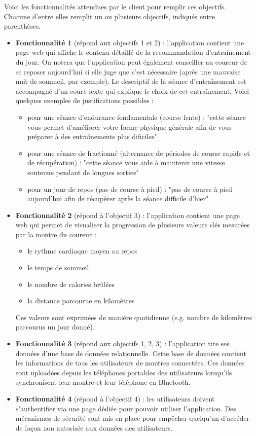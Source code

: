 \documentclass[french]{article}
\begin{document}
    Voici les fonctionnalités attendues par le client pour remplir ces objectifs. Chacune d'entre elles remplit un ou plusieurs objectifs, indiqués entre parenthèses.
    \begin{itemize}
        \item \textbf{Fonctionnalité 1} (répond aux objectifs 1 et 2) : l'application contient une page web qui affiche le contenu détaillé de la recommandation d'entraînement du jour. On notera que l'application peut également conseiller au coureur de se reposer aujourd'hui si elle juge que c'est nécessaire (après une mauvaise nuit de sommeil, par exemple). Le descriptif de la séance d'entraînement est accompagné d'un court texte qui explique le choix de cet entraînement. Voici quelques exemples de justifications possibles :
        \begin{itemize}
            \item pour une séance d'endurance fondamentale (course lente) : "cette séance vous permet d'améliorer votre forme physique générale afin de vous préparer à des entraînements plus dificiles"
            \item pour une séance de fractionné (alternance de périodes de course rapide et de récupération) : "cette séance vous aide à maintenir une vitesse soutenue pendant de longues sorties"
            \item pour un jour de repos (pas de course à pied) : "pas de course à pied aujourd'hui afin de récupérer après la séance difficile d'hier"
        \end{itemize}
        \item \textbf{Fonctionnalité 2} (répond à l'objectif 3) : l'application contient une page web qui permet de visualiser la progression de plusieurs valeurs clés mesurées par la montre du coureur :
        \begin{itemize}
            \item le rythme cardiaque moyen au repos
            \item le temps de sommeil
            \item le nombre de calories brûlées
            \item la distance parcourue en kilomètres
        \end{itemize}
        Ces valeurs sont exprimées de manière quotidienne (e.g. nombre de kilomètres parcourus un jour donné).
        \item \textbf{Fonctionnalité 3} (répond aux objectifs 1, 2, 3) : l'application tire ses données d'une base de données relationnelle. Cette base de données contient les informations de tous les utilisateurs de montres connectées. Ces données sont uploadées depuis les téléphones portables des utilisateurs lorsqu'ils synchronisent leur montre et leur téléphone en Bluetooth.
        \item \textbf{Fonctionnalité 4} (répond à l'objectif 4) : les utilisateurs doivent s'authentifier via une page dédiée pour pouvoir utiliser l'application. Des mécanismes de sécurité sont mis en place pour empêcher quelqu'un d'accéder de façon non autorisée aux données des utilisateurs.
    \end{itemize}
\end{document}
